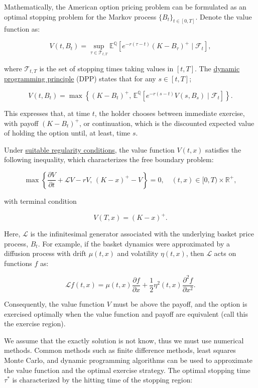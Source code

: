 \documentclass[titlepage]{article}
\begin{document}
Mathematically, the American option pricing problem can be formulated as an optimal stopping problem for the Markov process \(\{B_t\}_{t \in [0,T]}\). Denote the value function as:

\[
V(t, B_t) = \sup_{\tau \in \mathcal{T}_{t,T}} \mathbb{E}^{\mathbb{Q}}\left[ e^{-r (\tau - t)} (K - B_\tau)^+ \mid \mathcal{F}_t \right],
\]

where \(\mathcal{T}_{t,T}\) is the set of stopping times taking values in \([t,T]\). The \hyperref[sec:DPP]{dynamic programming principle} (DPP) states that for any $s \in [t,T]$;

\[
V(t, B_t) = \max\left\{ (K - B_t)^+, \, \mathbb{E}^{\mathbb{Q}}\left[ e^{-r (s - t)} V(s, B_s) \mid \mathcal{F}_t \right] \right\}.
\]

This expresses that, at time \(t\), the holder chooses between immediate exercise, with payoff \((K - B_t)^+\), or continuation, which is the discounted expected value of holding the option until, at least, time \(s\).

Under \hyperref[sec:regularity conditions]{suitable regularity conditions}, the value function \(V(t, x)\) satisfies the following inequality, which characterizes the free boundary problem:

\begin{equation}
\max \left\{ \frac{\partial V}{\partial t} + \mathcal{L} V - r V, \, (K - x)^+ - V \right\} = 0, \quad (t,x) \in [0,T) \times \mathbb{R}^+,
\label{eq:variational_inequality}
\end{equation}

with terminal condition

\[
V(T, x) = (K - x)^+.
\]

Here, \(\mathcal{L}\) is the infinitesimal generator associated with the underlying basket price process, \(B_t\). For example, if the basket dynamics were approximated by a diffusion process with drift \(\mu(t,x)\) and volatility \(\eta(t,x)\), then \(\mathcal{L}\) acts on functions \(f\) as:

\[
\mathcal{L} f(t,x) = \mu(t,x) \frac{\partial f}{\partial x} + \frac{1}{2} \eta^2(t,x) \frac{\partial^2 f}{\partial x^2}.
\]

Consequently, the value function \(V\) must be above the payoff, and the option is exercised optimally when the value function and payoff are equivalent (call this the exercise region).

We assume that the exactly solution is not know, thus we must use numerical methods. Common methods such as finite difference methods, least squares Monte Carlo, and dynamic programming algorithms can be used to approximate the value function and the optimal exercise strategy. The optimal stopping time \(\tau^*\) is characterized by the hitting time of the stopping region:
\end{document}
